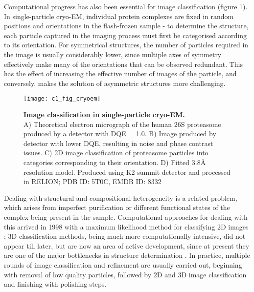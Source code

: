\documentclass[a4paper,11pt,twoside,openright]{scrbook}
\begin{document}
Computational progress has also been essential for image classification (figure \ref{figure:cryoem}). In single-particle cryo-EM, individual protein complexes are fixed in random positions and orientations in the flash-frozen sample - to determine the structure, each particle captured in the imaging process must first be categorised according to its orientation. For symmetrical structures, the number of particles required in the image is usually considerably lower, since multiple axes of symmetry effectively make many of the orientations that can be observed redundant. This has the effect of increasing the effective number of images of the particle, and conversely, makes the solution of asymmetric structures more challenging.

\begin{figure}
    \texttt{[image: c1\_fig\_cryoem]}
    \caption[Image classification in single-particle cryo-EM]{\sffamily \textbf{Image classification in single-particle cryo-EM.} \\ \small A) Theoretical electron micrograph of the human 26S proteasome produced by a detector with DQE = 1.0. B) Image produced by detector with lower DQE, resulting in noise and phase contrast issues. C) 2D image classification of proteasome particles into categories corresponding to their orientation. D) Fitted 3.8Å resolution model. Produced using K2 summit detector and processed in RELION; PDB ID: 5T0C, EMDB ID: 8332 \cite{Chen2016}}
    \label{figure:cryoem}
\end{figure}

Dealing with structural and compositional heterogeneity is a related problem, which arises from imperfect purification or different functional states of the complex being present in the sample. Computational approaches for dealing with this arrived in 1998 with a maximum likelihood method for classifying 2D images \cite{Sigworth1998}; 3D classification methods, being much more computationally intensive, did not appear till later, but are now an area of active development, since at present they are one of the major bottlenecks in structure determination \cite{Scheres2007,Lyumkis2013,Punjani2017}. In practice, multiple rounds of image classification and refinement are usually carried out, beginning with removal of low quality particles, followed by 2D and 3D image classification and finishing with polishing steps.
\end{document}

